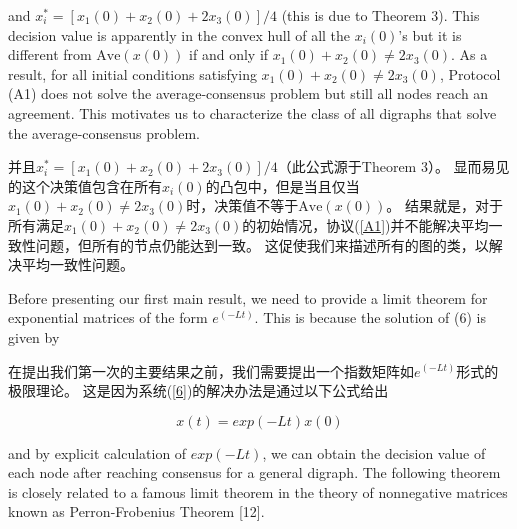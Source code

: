\documentclass{article}
\begin{document}

{\color[gray]{0.5}
\noindent and $x^*_i = [x_1(0) + x_2(0) + 2x_3(0)]/4$ (this is due to Theorem 3). 
This decision value is apparently in the convex hull of all the $x_i(0)$’s but it is diﬀerent from $\text{Ave}(x(0))$ if and only if $x_1(0) + x_2(0) \ne 2x_3(0)$. 
As a result, for all initial conditions satisfying $x_1(0) + x_2(0) \ne 2x_3(0)$, Protocol (A1) does not solve the average-consensus problem but still all nodes reach an agreement. 
This motivates us to characterize the class of all digraphs that solve the average-consensus problem.
}

\noindent 并且$x^*_i = [x_1(0) + x_2(0) + 2x_3(0)]/4$（此公式源于Theorem 3）。
显而易见的这个决策值包含在所有$x_i(0)$的凸包中，但是当且仅当$x_1(0) + x_2(0) \ne 2x_3(0)$时，决策值不等于$\text{Ave}(x(0))$。
结果就是，对于所有满足$x_1(0) + x_2(0) \ne 2x_3(0)$的初始情况，协议(\ref{A1})并不能解决平均一致性问题，但所有的节点仍能达到一致。
这促使我们来描述所有的图的类，以解决平均一致性问题。

{\color[gray]{0.5}
Before presenting our ﬁrst main result, we need to provide a limit theorem for exponential matrices of the form $e^{(-Lt)}$. 
This is because the solution of (6) is given by
}

在提出我们第一次的主要结果之前，我们需要提出一个指数矩阵如$e^{(-Lt)}$形式的极限理论。
这是因为系统(\ref{6})的解决办法是通过以下公式给出

\begin{equation}
    x(t) = exp(-Lt)x(0)
    \tag{17}
    \label{17}
\end{equation}

{\color[gray]{0.5}
\noindent and by explicit calculation of $exp(-Lt)$, we can obtain the decision value of each node after reaching consensus for a general digraph. 
The following theorem is closely related to a famous limit theorem in the theory of nonnegative matrices known as Perron-Frobenius Theorem [12].
}
\end{document}
